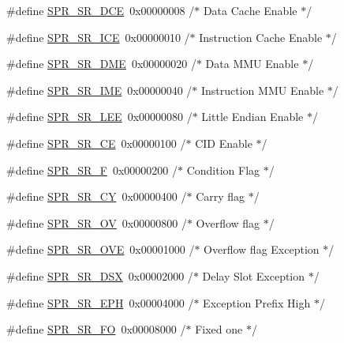\begin{DoxyCompactItemize}
\item 
\#define \hyperlink{spr-defs_8h_a1f790320f4575155698f958a4119480a}{\-S\-P\-R\-\_\-\-S\-R\-\_\-\-D\-C\-E}~0x00000008  /$\ast$ Data Cache Enable $\ast$/
\item 
\#define \hyperlink{spr-defs_8h_a386792a3bd4348db52eb28cbd133a0d0}{\-S\-P\-R\-\_\-\-S\-R\-\_\-\-I\-C\-E}~0x00000010  /$\ast$ Instruction Cache Enable $\ast$/
\item 
\#define \hyperlink{spr-defs_8h_a44317b89a91ff1658d8b3b342e40b88e}{\-S\-P\-R\-\_\-\-S\-R\-\_\-\-D\-M\-E}~0x00000020  /$\ast$ Data M\-M\-U Enable $\ast$/
\item 
\#define \hyperlink{spr-defs_8h_a9e9f5f7a1059b61a5611f66400092d9e}{\-S\-P\-R\-\_\-\-S\-R\-\_\-\-I\-M\-E}~0x00000040  /$\ast$ Instruction M\-M\-U Enable $\ast$/
\item 
\#define \hyperlink{spr-defs_8h_ae498c800649c3db2373a1ceb2ad1e573}{\-S\-P\-R\-\_\-\-S\-R\-\_\-\-L\-E\-E}~0x00000080  /$\ast$ Little Endian Enable $\ast$/
\item 
\#define \hyperlink{spr-defs_8h_a16c22879b4a391f46a49eb633518887f}{\-S\-P\-R\-\_\-\-S\-R\-\_\-\-C\-E}~0x00000100  /$\ast$ C\-I\-D Enable $\ast$/
\item 
\#define \hyperlink{spr-defs_8h_a2f84d2c4b84979610b5112ddd22a9a5e}{\-S\-P\-R\-\_\-\-S\-R\-\_\-\-F}~0x00000200  /$\ast$ Condition Flag $\ast$/
\item 
\#define \hyperlink{spr-defs_8h_a40a3ea6050feb4a29c74b198bb86e46d}{\-S\-P\-R\-\_\-\-S\-R\-\_\-\-C\-Y}~0x00000400  /$\ast$ Carry flag $\ast$/
\item 
\#define \hyperlink{spr-defs_8h_a33c465a2750a0309808bdbdc493e2cbf}{\-S\-P\-R\-\_\-\-S\-R\-\_\-\-O\-V}~0x00000800  /$\ast$ Overflow flag $\ast$/
\item 
\#define \hyperlink{spr-defs_8h_af6dff5d1767a530a382638c7bf0a65a8}{\-S\-P\-R\-\_\-\-S\-R\-\_\-\-O\-V\-E}~0x00001000  /$\ast$ Overflow flag Exception $\ast$/
\item 
\#define \hyperlink{spr-defs_8h_a89ea7ae237460e04c77578e914b33e9b}{\-S\-P\-R\-\_\-\-S\-R\-\_\-\-D\-S\-X}~0x00002000  /$\ast$ Delay Slot Exception $\ast$/
\item 
\#define \hyperlink{spr-defs_8h_a584058371d6491e2fd7c08d4387d0c18}{\-S\-P\-R\-\_\-\-S\-R\-\_\-\-E\-P\-H}~0x00004000  /$\ast$ Exception Prefix High $\ast$/
\item 
\#define \hyperlink{spr-defs_8h_a2e9db4f88d1fdf94eb02ec5158351790}{\-S\-P\-R\-\_\-\-S\-R\-\_\-\-F\-O}~0x00008000  /$\ast$ Fixed one $\ast$/
\item 

\end{DoxyCompactItemize}
